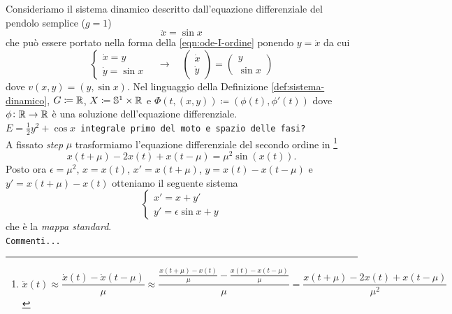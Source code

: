 \begin{example}
	Consideriamo il sistema dinamico descritto dall'equazione differenziale del pendolo semplice ($ g = 1 $)
	\[
		\ddot{x} = \sin{x}
	\]
	che può essere portato nella forma della \eqref{eqn:ode-I-ordine} ponendo $ y = \dot{x} $ da cui 
	\[
		\begin{cases}
			\dot{x} = y \\
			\dot{y} = \sin{x}
		\end{cases}
		\quad \rightarrow \quad
		\begin{pmatrix}
			\dot{x} \\ \dot{y}
		\end{pmatrix}
		=
		\begin{pmatrix}
			y \\ \sin{x}
		\end{pmatrix}
	\]
	dove $ v(x, y) = (y, \sin{x}) $. Nel linguaggio della Definizione \ref{def:sistema-dinamico}, $ G \coloneqq \mathbb{R} $, $ X \coloneqq \mathbb{S}^1 \times \mathbb{R}  $ e $ {\Phi(t, (x, y)) \coloneqq (\phi(t), \phi'(t))} $ dove $ \phi \colon \mathbb{R} \to \mathbb{R} $ è una soluzione dell'equazione differenziale. \\
	\texttt{$ E = \frac{1}{2}y^2 + \cos{x} $ integrale primo del moto e spazio  delle fasi?} \\
	A fissato \emph{step} $ \mu $ trasformiamo l'equazione differenziale del secondo ordine in \footnote{%
		\[
			\ddot{x}(t) \approx \frac{\dot{x}(t) - \dot{x}(t - \mu)}{\mu} \approx \frac{\frac{x(t + \mu) - x(t)}{\mu} - \frac{x(t) - x(t - \mu)}{\mu}}{\mu} = \frac{x(t + \mu) - 2x(t) + x(t - \mu)}{\mu^2}
		\]
	}
	\[
		x(t + \mu) - 2 x(t) + x(t - \mu) = \mu^2 \sin(x(t)).
	\]
	Posto ora $ \epsilon = \mu^2 $, $ x = x(t) $, $ x' = x(t + \mu) $, $ y = x(t) - x(t - \mu) $ e $ y' = x(t + \mu) - x(t) $ otteniamo il seguente sistema 
	\[
		\begin{cases}
			x' = x + y' \\
			y' = \epsilon \sin{x} + y 
		\end{cases}
	\]
	che è la \emph{mappa standard}. \\
	\texttt{Commenti...}
	

\end{example}
